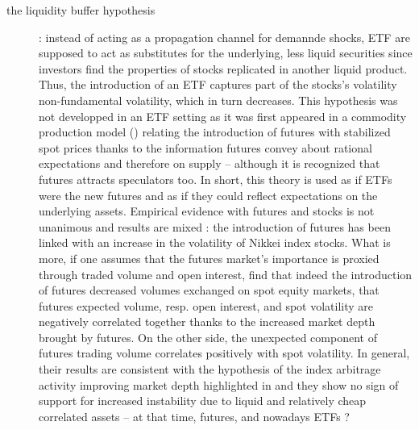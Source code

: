 \begin{description}
  \item[the liquidity buffer hypothesis]: instead of acting as a propagation channel for demannde shocks, ETF are supposed to act as substitutes for the underlying, less liquid securities since investors find the properties of stocks replicated in another liquid product. Thus, the introduction of an ETF captures part of the stocks's volatility non-fundamental volatility, which in turn decreases. This hypothesis was not developped in an ETF setting as it was first appeared in a commodity production model (\textcite{Danthine1978}) relating the introduction of futures with stabilized spot prices thanks to the information futures convey about rational expectations and therefore on supply -- although it is recognized that futures attracts speculators too. In short, this theory is used as if ETFs were the new futures and as if they could reflect expectations on the underlying assets. Empirical evidence with futures and stocks is not unanimous and results are mixed : the introduction of futures has been linked with an increase in the volatility of Nikkei index stocks. What is more, if one assumes that the futures market's importance is proxied through traded volume and open interest, \textcite{Bessembinder1992} find that indeed the introduction of futures decreased volumes exchanged on spot equity markets, that futures expected volume, resp. open interest, and spot volatility are negatively correlated together thanks to the increased market depth brought by futures. On the other side, the unexpected component of futures trading volume correlates positively with spot volatility. In general, their results are consistent with the hypothesis of the index arbitrage activity improving market depth highlighted in \textcite{Grossman1988} and they show no sign of support for increased instability due to liquid and relatively cheap correlated assets -- at that time, futures, and nowadays ETFs ?  
\end{description}
